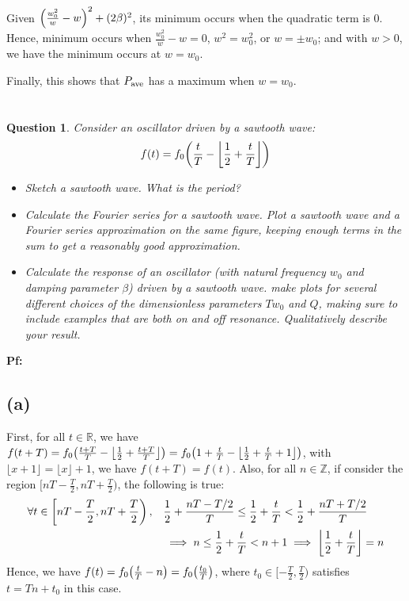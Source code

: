 \documentclass{article}
\newtheorem{question}{Question}
\newcommand{\ZZ}{\mathbb{Z}}
\newcommand{\RR}{\mathbb{R}}
\DeclarePairedDelimiter{\paran}{(}{)}%
\DeclarePairedDelimiter{\floor}{\lfloor}{\rfloor}
\begin{document}
Given $\paran*{\frac{w_0^2}{w}-w}^2+(2\beta)^2$, its minimum occurs when the quadratic term is $0$. Hence, minimum occurs when $\frac{w_0^2}{w}-w=0$, $w^2=w_0^2$, or $w=\pm w_0$; and with $w>0$, we have the minimum occurs at $w=w_0$.

Finally, this shows that $P_\textmd{ave}$ has a maximum when $w=w_0$.

\break


\section{}
\begin{question}\label{q4}
    Consider an oscillator driven by a sawtooth wave:
    $$f(t)=f_0\paran*{\frac{t}{T}-\left\lfloor\frac{1}{2}+\frac{t}{T}\right\rfloor}$$
    \begin{itemize}
        \item[(a)] Sketch a sawtooth wave. What is the period?
        \item[(b)] Calculate the Fourier series for a sawtooth wave. Plot a sawtooth wave and a Fourier series approximation on the same figure, keeping enough terms in the sum to get a reasonably good approximation.
        \item[(c)] Calculate the response of an oscillator (with natural frequency $w_0$ and damping parameter $\beta$) driven by a sawtooth wave. make plots for several different choices of the dimensionless parameters $Tw_0$ and $Q$, making sure to include examples that are both on and off resonance. Qualitatively describe your result.
    \end{itemize}
\end{question}

\textbf{Pf:}
\subsection*{(a)}
First, for all $t \in \RR$, we have $f(t+T) = f_0\paran*{\frac{t+T}{T}-\left\lfloor\frac{1}{2}+\frac{t+T}{T}\right\rfloor}=f_0\paran*{1+\frac{t}{T}-\left\lfloor\frac{1}{2}+\frac{t}{T}+1\right\rfloor}$, with $\lfloor x+1\rfloor = \lfloor x\rfloor +1$, we have $f(t+T)=f(t)$.
Also, for all $n \in \ZZ$, if consider the region $[nT-\frac{T}{2},nT+\frac{T}{2})$, the following is true:
\begin{align}
    \forall t \in \left[nT-\frac{T}{2},nT+\frac{T}{2}\right),\quad &\frac{1}{2}+\frac{nT-T/2}{T}\leq \frac{1}{2}+\frac{t}{T}<\frac{1}{2}+\frac{nT+T/2}{T}\\
    &\implies n\leq \frac{1}{2}+\frac{t}{T}<n+1\implies \floor*{\frac{1}{2}+\frac{t}{T}}=n
\end{align}
Hence, we have $f(t) = f_0\paran*{\frac{t}{T}-n} = f_0\paran*{\frac{t_0}{T}}$, where $t_0\in [-\frac{T}{2},\frac{T}{2})$ satisfies $t = Tn+t_0$ in this case.
\end{document}
